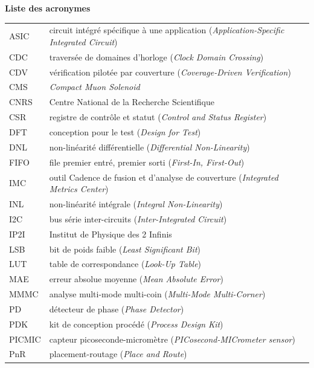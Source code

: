 \clearpage
{}
{}
{\huge\bfseries Liste des acronymes\par}
\vspace{1.2em}
\renewcommand{\arraystretch}{1.2}
\begin{tabularx}{\textwidth}{lX}
ASIC & circuit intégré spécifique à une application (\textit{Application-Specific Integrated Circuit}) \\
CDC & traversée de domaines d'horloge (\textit{Clock Domain Crossing}) \\
CDV & vérification pilotée par couverture (\textit{Coverage-Driven Verification}) \\
CMS & \textit{Compact Muon Solenoid} \\
CNRS & Centre National de la Recherche Scientifique \\
CSR & registre de contrôle et statut (\textit{Control and Status Register}) \\
DFT & conception pour le test (\textit{Design for Test}) \\
DNL & non-linéarité différentielle (\textit{Differential Non-Linearity}) \\
FIFO & file premier entré, premier sorti (\textit{First-In, First-Out}) \\
IMC & outil Cadence de fusion et d'analyse de couverture (\textit{Integrated Metrics Center}) \\
INL & non-linéarité intégrale (\textit{Integral Non-Linearity}) \\
I2C & bus série inter-circuits (\textit{Inter-Integrated Circuit}) \\
IP2I & Institut de Physique des 2 Infinis \\
LSB & bit de poids faible (\textit{Least Significant Bit}) \\
LUT & table de correspondance (\textit{Look-Up Table}) \\
MAE & erreur absolue moyenne (\textit{Mean Absolute Error}) \\
MMMC & analyse multi-mode multi-coin (\textit{Multi-Mode Multi-Corner}) \\
PD & détecteur de phase (\textit{Phase Detector}) \\
PDK & kit de conception procédé (\textit{Process Design Kit}) \\
PICMIC & capteur picoseconde-micromètre (\textit{PICosecond-MICrometer sensor}) \\
PnR & placement-routage (\textit{Place and Route}) \\

\end{tabularx}
